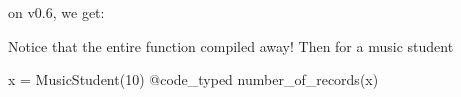 \documentclass[11pt]{article}
\newenvironment{Shaded}{}{}
\newcommand{\DataTypeTok}[1]{\textcolor[rgb]{0.56,0.13,0.00}{{#1}}}
\newcommand{\FloatTok}[1]{\textcolor[rgb]{0.25,0.63,0.44}{{#1}}}
\newcommand{\CommentTok}[1]{\textcolor[rgb]{0.38,0.63,0.69}{\textit{{#1}}}}
\newcommand{\NormalTok}[1]{{#1}}
\begin{document}
    on v0.6, we get:

\begin{Shaded}
\end{Shaded}

Notice that the entire function compiled away! Then for a music student

\begin{Shaded}
\begin{Highlighting}[]
\NormalTok{x = MusicStudent(}\FloatTok{10}\NormalTok{)}
\NormalTok{@code_typed number_of_records(x)}


\end{Highlighting}
\end{Shaded}
\end{document}
